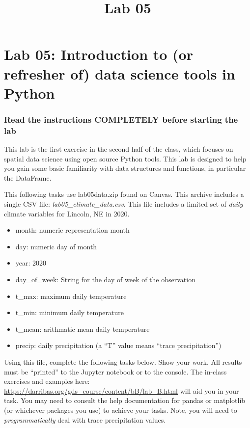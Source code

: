 \documentclass[]{article}
\title{Lab 05}
\author{}
\date{}
\makeatletter
\providecommand{\tightlist}{%
  \setlength{\itemsep}{0pt}\setlength{\parskip}{0pt}}
\renewcommand{\maketitle}{\bgroup\vspace*{-1cm}\setlength{\parindent}{0pt}
\begin{flushleft}
  \@author
  
  \@date
  
\end{flushleft}\egroup
}
\makeatother
\begin{document}
\maketitle

\hypertarget{lab-05-introduction-to-or-refresher-of-data-science-tools-in-python}{%
\section{Lab 05: Introduction to (or refresher of) data science tools in
Python}\label{lab-05-introduction-to-or-refresher-of-data-science-tools-in-python}}

\hypertarget{read-the-instructions-completely-before-starting-the-lab}{%
\subsubsection{Read the instructions COMPLETELY before starting the
lab}\label{read-the-instructions-completely-before-starting-the-lab}}

This lab is the first exercise in the second half of the class, which
focuses on spatial data science using open source Python tools. This lab
is designed to help you gain some basic familiarity with data structures
and functions, in particular the DataFrame.

This following tasks use lab05data.zip found on Canvas. This archive
includes a single CSV file: \emph{lab05\_climate\_data.csv}. This file
includes a limited set of \emph{daily} climate variables for Lincoln, NE
in 2020.

\begin{itemize}
\tightlist
\item
  month: numeric representation month
\item
  day: numeric day of month
\item
  year: 2020
\item
  day\_of\_week: String for the day of week of the observation
\item
  t\_max: maximum daily temperature
\item
  t\_min: minimum daily temperature
\item
  t\_mean: arithmatic mean daily temperature
\item
  precip: daily precipitation (a ``T'' value means ``trace
  precipitation'')
\end{itemize}

Using this file, complete the following tasks below. Show your work. All
results must be ``printed'' to the Jupyter notebook or to the console.
The in-class exercises and examples here:
\url{https://darribas.org/gds_course/content/bB/lab_B.html} will aid you
in your task. You may need to consult the help documentation for pandas
or matplotlib (or whichever packages you use) to achieve your tasks.
Note, you will need to \emph{programmatically} deal with trace
precipitation values.
\end{document}
